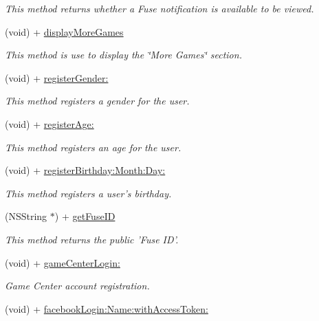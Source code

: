\begin{DoxyCompactItemize}
\begin{DoxyCompactList}\small\item\em This method returns whether a Fuse notification is available to be viewed. \end{DoxyCompactList}\item 
(void) + \hyperlink{interface_fuse_s_d_k_ac7c361dc8e2935cbd32cbdd6c5c8952b}{display\+More\+Games}
\begin{DoxyCompactList}\small\item\em This method is use to display the \char`\"{}\+More Games\char`\"{} section. \end{DoxyCompactList}\item 
(void) + \hyperlink{interface_fuse_s_d_k_a2b0c7be7abc4ec4ae6912f295d21e64c}{register\+Gender\+:}
\begin{DoxyCompactList}\small\item\em This method registers a gender for the user. \end{DoxyCompactList}\item 
(void) + \hyperlink{interface_fuse_s_d_k_a33903ca8d52be440186c4bbf1cbe510c}{register\+Age\+:}
\begin{DoxyCompactList}\small\item\em This method registers an age for the user. \end{DoxyCompactList}\item 
(void) + \hyperlink{interface_fuse_s_d_k_a5dcbaec8b00d90c4970e1b752e5dc719}{register\+Birthday\+:\+Month\+:\+Day\+:}
\begin{DoxyCompactList}\small\item\em This method registers a user's birthday. \end{DoxyCompactList}\item 
(N\+S\+String $\ast$) + \hyperlink{interface_fuse_s_d_k_ab483c2a3f4439aad8e19200cf24ff731}{get\+Fuse\+I\+D}
\begin{DoxyCompactList}\small\item\em This method returns the public 'Fuse I\+D'. \end{DoxyCompactList}\item 
(void) + \hyperlink{interface_fuse_s_d_k_a02a3bc5562d4f6e50bac5339f4ac4046}{game\+Center\+Login\+:}
\begin{DoxyCompactList}\small\item\em Game Center account registration. \end{DoxyCompactList}\item 
(void) + \hyperlink{interface_fuse_s_d_k_a7003a2102cba9c87fa127e39c95a5d1d}{facebook\+Login\+:\+Name\+:with\+Access\+Token\+:}

\end{DoxyCompactItemize}

